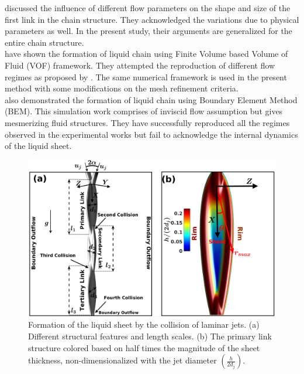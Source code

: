 \cite{yang2014liquid} discussed the influence of different flow parameters on the shape and size of the first link in the chain structure. They acknowledged the variations due to physical parameters as well. In the present study, their arguments are generalized for the entire chain structure.\\
\cite{chen2013high} have shown the formation of liquid chain using Finite Volume based Volume of Fluid (VOF) framework. They attempted the reproduction of different flow regimes as proposed by \cite{bush2004collision}. The same numerical framework is used in the present method with some modifications on the mesh refinement criteria.\\
\cite{da2016surface} also demonstrated the formation of liquid chain using Boundary Element Method (BEM). This simulation work comprises of inviscid flow assumption but gives mesmerizing fluid structures. They have successfully reproduced all the regimes observed in the experimental works but fail to acknowledge the internal dynamics of the liquid sheet.\\

\begin{figure}
	\centering
	\includegraphics[width=\textwidth]{chapters/Figure1}
	\caption{Formation of the liquid sheet by the collision of laminar jets. (a) Different structural features and length scales. (b) The primary link structure colored based on half times the magnitude of the sheet thickness, non-dimensionalized with the jet diameter $\left(\frac{h}{2d_j}\right)$.}
	\label{Figure::schematic}
\end{figure}
